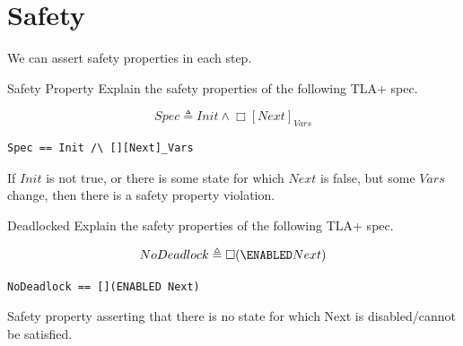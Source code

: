 \section{Safety}
We can assert safety properties in each step.
\begin{examplebox}{Safety Property}
    Explain the safety properties of the following TLA+ spec.
    \begin{center}
        \begin{minipage}{.49\textwidth}
            \[Spec \triangleq Init \land \Box [Next]_{Vars}\]
        \end{minipage} \hfill \begin{minipage}{.49\textwidth}
            \begin{verbatim}
Spec == Init /\ [][Next]_Vars
            \end{verbatim}
        \end{minipage}    
    \end{center}
    \tcblower
    If $Init$ is not true, or there is some state for which $Next$ is false, but some $Vars$ change, then there is a safety property violation.
\end{examplebox}
\begin{examplebox}{Deadlocked}
    Explain the safety properties of the following TLA+ spec.
    \begin{center}
        \begin{minipage}{.49\textwidth}
            \[NoDeadlock \triangleq \Box(\ENABLED Next)\]
        \end{minipage} \hfill \begin{minipage}{.49\textwidth}
            \begin{verbatim}
NoDeadlock == [](ENABLED Next)
            \end{verbatim}
        \end{minipage}    
    \end{center}
    \tcblower
    Safety property asserting that there is no state for which Next is disabled/cannot be satisfied.
\end{examplebox}

